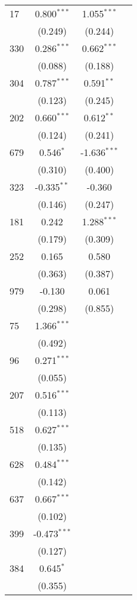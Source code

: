 \begin{longtable}{lccc}
    17  & 0.800$^{\ast\ast\ast}$ & 1.055$^{\ast\ast\ast}$ &  \\
    & (0.249) & (0.244) &  \\
    330 & 0.286$^{\ast\ast\ast}$ & 0.662$^{\ast\ast\ast}$ &  \\
    & (0.088) & (0.188) &  \\
    304 & 0.787$^{\ast\ast\ast}$ & 0.591$^{\ast\ast}$ &  \\
    & (0.123) & (0.245) &  \\
    202 & 0.660$^{\ast\ast\ast}$ & 0.612$^{\ast\ast}$ &  \\
    & (0.124) & (0.241) &  \\
    679 & 0.546$^{\ast}$ & -1.636$^{\ast\ast\ast}$ &  \\
    & (0.310) & (0.400) &  \\
    323 & -0.335$^{\ast\ast}$ & -0.360 &  \\
    & (0.146) & (0.247) &  \\
    181 & 0.242 & 1.288$^{\ast\ast\ast}$ &  \\
    & (0.179) & (0.309) &  \\
    252 & 0.165 & 0.580 &  \\
    & (0.363) & (0.387) &  \\
    979 & -0.130 & 0.061 &  \\
    & (0.298) & (0.855) &  \\
    75  & 1.366$^{\ast\ast\ast}$ &  &  \\
    & (0.492) &  &  \\
    96  & 0.271$^{\ast\ast\ast}$ &  &  \\
    & (0.055) &  &  \\
    207 & 0.516$^{\ast\ast\ast}$ &  &  \\
    & (0.113) &  &  \\
    518 & 0.627$^{\ast\ast\ast}$ &  &  \\
    & (0.135) &  &  \\
    628 & 0.484$^{\ast\ast\ast}$ &  &  \\
    & (0.142) &  &  \\
    637 & 0.667$^{\ast\ast\ast}$ &  &  \\
    & (0.102) &  &  \\
    399 & -0.473$^{\ast\ast\ast}$ &  &  \\
    & (0.127) &  &  \\
    384 & 0.645$^{\ast}$ &  &  \\
    & (0.355) &  &  \\

\end{longtable}
